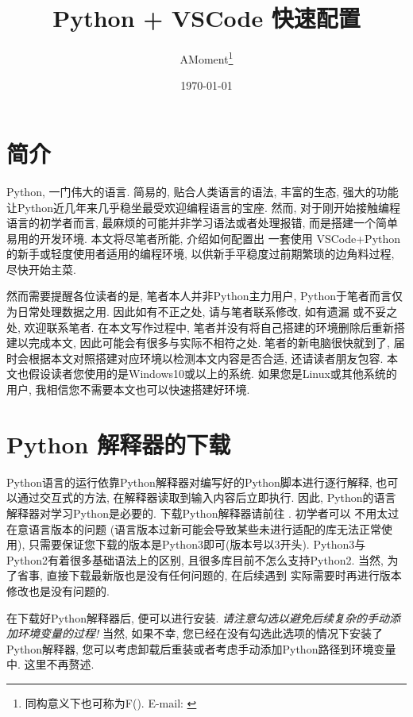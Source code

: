 \documentclass[11pt]{article}
\newcommand{\bhref}[2]{
    \href{#1}{\color{blue}{#2}}
}
\begin{document}
\title{Python + VSCode 快速配置}
\author{AMoment\thanks{同构意义下也可称为F(). E-mail: \bhref{mailto:amoment096@gmail.com}{amoment096@gmail.com}}}
\date{\today}
\maketitle
\tableofcontents

\section{简介}\label{Intro}
Python, 一门伟大的语言. 简易的, 贴合人类语言的语法, 丰富的生态, 强大的功能让Python近几年来几乎稳坐最受欢迎编程语言的宝座. 然而,
对于刚开始接触编程语言的初学者而言, 最麻烦的可能并非学习语法或者处理报错, 而是搭建一个简单易用的开发环境. 本文将尽笔者所能, 介绍如何配置出
一套使用 VSCode+Python 的新手或轻度使用者适用的编程环境, 以供新手平稳度过前期繁琐的边角料过程, 尽快开始主菜.

然而需要提醒各位读者的是, 笔者本人并非Python主力用户, Python于笔者而言仅为日常处理数据之用. 因此如有不正之处, 请与笔者联系修改, 如有遗漏
或不妥之处, 欢迎联系笔者. 在本文写作过程中, 笔者并没有将自己搭建的环境删除后重新搭建以完成本文, 因此可能会有很多与实际不相符之处.
笔者的新电脑很快就到了, 届时会根据本文对照搭建对应环境以检测本文内容是否合适, 还请读者朋友包容.
本文也假设读者您使用的是Windows10或以上的系统. 如果您是Linux或其他系统的用户, 我相信您不需要本文也可以快速搭建好环境.

\section{Python 解释器的下载}\label{Python}
Python语言的运行依靠Python解释器对编写好的Python脚本进行逐行解释, 也可以通过交互式的方法, 在解释器读取到输入内容后立即执行. 因此,
Python的语言解释器对学习Python是必要的. 下载Python解释器请前往\bhref{https://www.python.org/downloads/}{Python官网}. 初学者可以
不用太过在意语言版本的问题 (语言版本过新可能会导致某些未进行适配的库无法正常使用), 只需要保证您下载的版本是Python3即可(版本号以3开头).
Python3与Python2有着很多基础语法上的区别, 且很多库目前不怎么支持Python2. 当然, 为了省事, 直接下载最新版也是没有任何问题的, 在后续遇到
实际需要时再进行版本修改也是没有问题的.

在下载好Python解释器后, 便可以进行安装. \emph{\color{red}请注意勾选{}以避免后续复杂的手动添加环境变量的过程!}
当然, 如果不幸, 您已经在没有勾选此选项的情况下安装了Python解释器, 您可以考虑卸载后重装或者考虑手动添加Python路径到环境变量中. 这里不再赘述.
\end{document}
